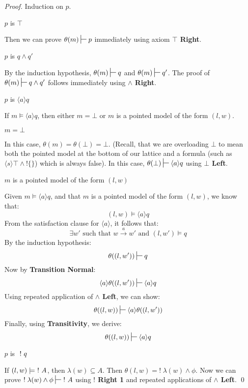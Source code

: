 \begin{proof}
Induction on $p$.
\setcounter{mycase}{0}

\begin{mycase}
$p$ is $\top$
\end{mycase}
Then we can prove  $\theta(m) \judge p$ immediately using axiom {\bf $\top$ Right}.

\begin{mycase}
$p$ is $q \land q'$
\end{mycase}
By the induction hypothesis, $\theta(m) \judge q$ and $\theta(m) \judge q'$.
The proof of $\theta(m) \judge q \land q'$ follows immediately using {\bf $\land$ Right}.

\begin{mycase}
$p$ is $\langle a \rangle q$
\end{mycase}
If $m \models \langle a \rangle q$, then either $m = \bot$ or $m$ is a pointed model of the form $(l,w)$.
\begin{subcase}
$m = \bot$
\end{subcase}
In this case, $\theta(m) = \theta(\bot) = \bot$. (Recall, that we are overloading $\bot$ to mean both the pointed model at the bottom of our lattice and a formula (such as $\langle s \rangle \top \land !\{\}$) which is always false).
In this case, $ \theta(\bot) \judge  \langle a \rangle q$ using {\bf $\bot$ Left}.

\begin{subcase}
 $m$ is a pointed model of the form $(l,w)$
 \end{subcase}
Given $m \models \langle a \rangle q$, and that $m$ is a pointed model of the form $(l,w)$, we know that:
\[
(l,w) \models \langle a \rangle q
\]
From the satisfaction clause for $\langle a \rangle$, it follows that:
\[
\exists w' \mbox{ such that } w \xrightarrow{a} w' \mbox { and } (l,w') \models q
\]
By the induction hypothesis:
\[
\theta( (l,w') ) \judge q
\]
Now by {\bf Transition Normal}:
\[
\langle a \rangle \theta( (l,w') ) \judge \langle a \rangle q
\]
Using repeated application of {\bf $\land$ Left}, we can show:
\[
\theta((l,w)) \judge \langle a \rangle \theta((l,w'))
\]
Finally, using {\bf Transitivity}, we derive:
\[
\theta((l,w)) \judge  \langle a \rangle q
\]
\begin{mycase}
$p$ is $\ ! \  q$
\end{mycase}
If $(l,w) \models \ ! \  A$, then $\lambda(w) \subseteq A$.
Then $\theta(l,w) = ! \; \lambda(w) \land \phi$.
Now we can prove $! \; \lambda(w) \land \phi \judge \fBang A$ using  {\bf $!$ Right 1} and repeated applications of {\bf $\land$ Left}.
\qed
\end{proof}

